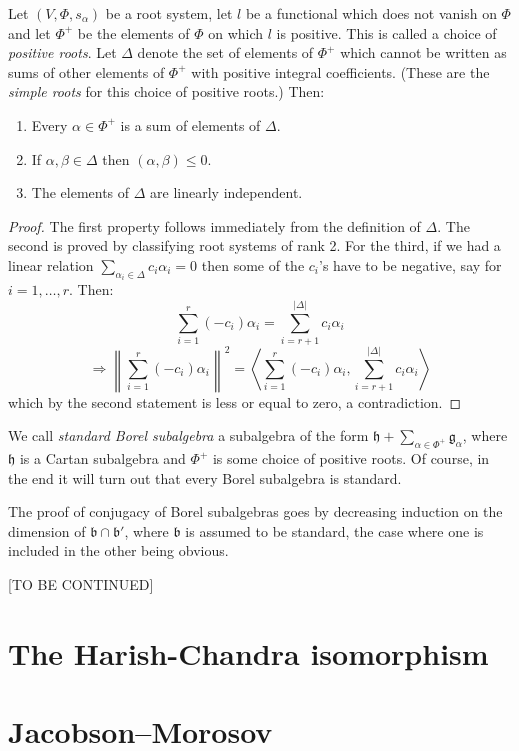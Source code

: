 \begin{proposition}
 Let $(V,\Phi,s_\alpha)$ be a root system, let $l$ be a functional which does not vanish on $\Phi$ and let $\Phi^+$ be the elements of $\Phi$ on which $l$ is positive. This is called a choice of \emph{positive roots}. Let $\Delta$ denote the set of elements of $\Phi^+$ which cannot be written as sums of other elements of $\Phi^+$ with positive integral coefficients. (These are the \emph{simple roots} for this choice of positive roots.) Then: 
\begin{enumerate}
 \item Every $\alpha\in\Phi^+$ is a sum of elements of $\Delta$.
 \item If $\alpha,\beta\in\Delta$ then $(\alpha,\beta)\le 0$.
 \item The elements of $\Delta$ are linearly independent.
\end{enumerate}

\begin{proof}
 The first property follows immediately from the definition of $\Delta$. The second is proved by classifying root systems of rank 2. For the third, if we had a linear relation $\sum_{\alpha_i\in \Delta} c_i\alpha_i=0$ then some of the $c_i$'s have to be negative, say for $i=1,\dots,r$. Then: $$\sum_{i=1}^r (-c_i)\alpha_i= \sum_{i=r+1}^{|\Delta|} c_i\alpha_i$$
$$\Rightarrow \left\|\sum_{i=1}^r (-c_i)\alpha_i\right\|^2 = \left<\sum_{i=1}^r (-c_i)\alpha_i, \sum_{i=r+1}^{|\Delta|} c_i\alpha_i\right>$$
which by the second statement is less or equal to zero, a contradiction.
\end{proof}


\end{proposition}


We call \emph{standard Borel subalgebra} a subalgebra of the form $\mathfrak h + \sum_{\alpha\in\Phi^+} \mathfrak g_\alpha$, where $\mathfrak h$ is a Cartan subalgebra and $\Phi^+$ is some choice of positive roots. Of course, in the end it will turn out that every Borel subalgebra is standard.

The proof of conjugacy of Borel subalgebras goes by decreasing induction on the dimension of $\mathfrak b\cap \mathfrak b'$, where $\mathfrak b$ is assumed to be standard, the case where one is included in the other being obvious. 

[TO BE CONTINUED]


\section{The Harish-Chandra isomorphism}


\section{Jacobson--Morosov}












